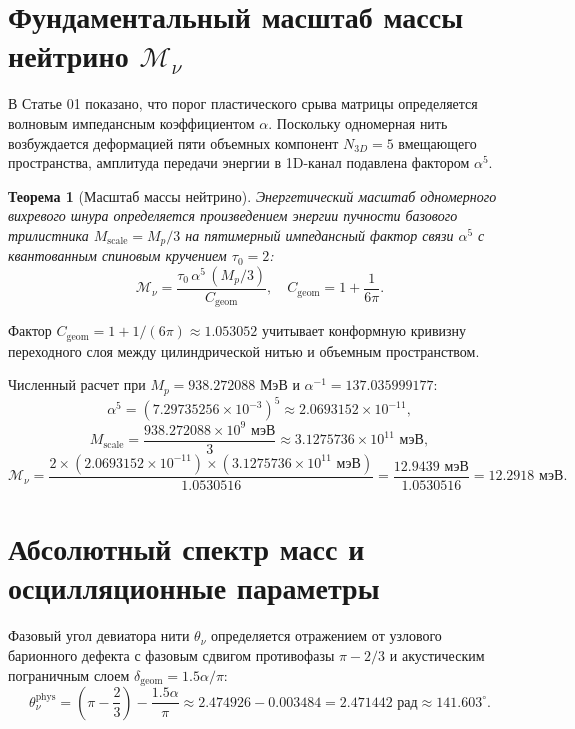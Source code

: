 \documentclass[11pt,a4paper]{article}
\newtheorem{theorem}{Теорема}
\theoremstyle{definition}
\theoremstyle{remark}
\begin{document}
\section{Фундаментальный масштаб массы нейтрино $\mathcal{M}_\nu$}
В Статье 01 показано, что порог пластического срыва матрицы определяется волновым импедансным коэффициентом $\alpha$. Поскольку одномерная нить возбуждается деформацией пяти объемных компонент $N_{3D} = 5$ вмещающего пространства, амплитуда передачи энергии в 1D-канал подавлена фактором $\alpha^5$.

\begin{theorem}[Масштаб массы нейтрино]
Энергетический масштаб одномерного вихревого шнура определяется произведением энергии пучности базового трилистника $M_{\mathrm{scale}} = M_p / 3$ на пятимерный импедансный фактор связи $\alpha^5$ с квантованным спиновым кручением $\tau_0 = 2$:
\begin{equation}
    \mathcal{M}_\nu = \frac{\tau_0 \, \alpha^5 \, (M_p / 3)}{C_{\mathrm{geom}}}, \quad C_{\mathrm{geom}} = 1 + \frac{1}{6\pi}.
\end{equation}
\end{theorem}
Фактор $C_{\mathrm{geom}} = 1 + 1/(6\pi) \approx 1.053052$ учитывает конформную кривизну переходного слоя между цилиндрической нитью и объемным пространством.

Численный расчет при $M_p = 938.272088\text{ МэВ}$ и $\alpha^{-1} = 137.035999177$:
\begin{equation}
    \alpha^5 = (7.29735256 \times 10^{-3})^5 \approx 2.0693152 \times 10^{-11},
\end{equation}
\begin{equation}
    M_{\mathrm{scale}} = \frac{938.272088 \times 10^9\text{ мэВ}}{3} \approx 3.1275736 \times 10^{11}\text{ мэВ},
\end{equation}
\begin{equation}
    \mathcal{M}_\nu = \frac{2 \times (2.0693152 \times 10^{-11}) \times (3.1275736 \times 10^{11}\text{ мэВ})}{1.0530516} = \frac{12.9439\text{ мэВ}}{1.0530516} = \mathbf{12.2918\text{ мэВ}}.
\end{equation}

\section{Абсолютный спектр масс и осцилляционные параметры}
Фазовый угол девиатора нити $\theta_\nu$ определяется отражением от узлового барионного дефекта с фазовым сдвигом противофазы $\pi - 2/3$ и акустическим пограничным слоем $\delta_{\mathrm{geom}} = 1.5\alpha/\pi$:
\begin{equation}
    \theta_\nu^{\mathrm{phys}} = \left( \pi - \frac{2}{3} \right) - \frac{1.5\alpha}{\pi} \approx 2.474926 - 0.003484 = \mathbf{2.471442\text{ рад}} \approx 141.603^\circ.
\end{equation}
\end{document}
